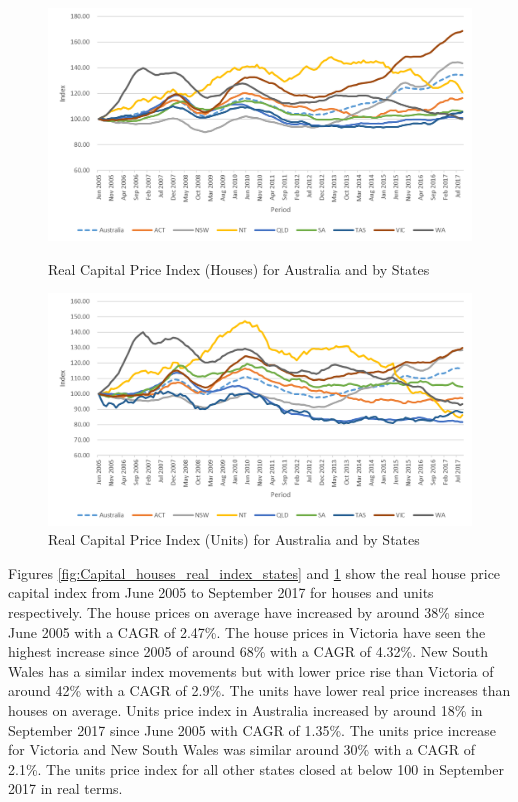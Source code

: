 \documentclass[AEJ,reqno, draftmode]{AEA}
\begin{document}
\begin{figure}[!htb]
    \centering
     \includegraphics[width=\columnwidth]{Figures/Capital_houses_real_index_states.png}
 \caption{Real Capital Price Index (Houses) for Australia and by States}
 \label{fig:Capital_houses_real_index_states}
 \includegraphics[width=\columnwidth]{Figures/Capital_units_real_index_states.png}
 \caption{Real Capital Price Index (Units) for Australia and by States}
 \label{fig:Capital_units_real_index_states}
\end{figure}


Figures \ref{fig:Capital_houses_real_index_states} and \ref{fig:Capital_units_real_index_states} show the real house price capital index from June 2005 to September 2017 for houses and units respectively. The house prices on average have increased by around 38\% since June 2005 with a CAGR of 2.47\%. The house prices in Victoria have seen the highest increase since 2005 of around 68\% with a CAGR of 4.32\%. New South Wales has a similar index movements but with lower price rise than Victoria of around 42\% with a CAGR of 2.9\%. The units have lower real price increases than houses on average. Units price index in Australia increased by around 18\% in September 2017 since June 2005 with CAGR of 1.35\%. The units price increase for Victoria and New South Wales was similar around 30\% with a CAGR of 2.1\%. The units price index for all other states closed at below 100 in September 2017 in real terms.
\end{document}
